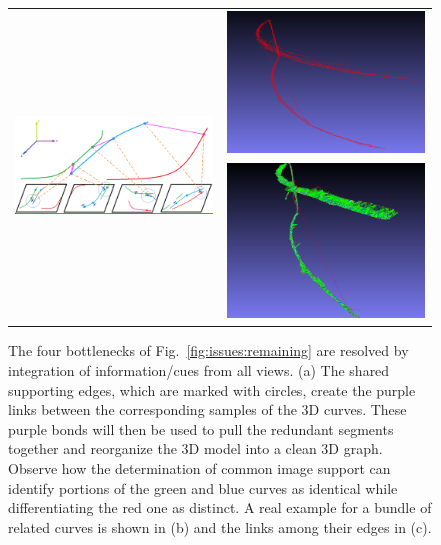 \documentclass[a4paper,titlepage]{article}
\newcommand{\draftnote}[1]{\marginpar{\tiny\raggedright\textsf{\hspace{0pt}#1}}}
\begin{document}
\begin{figure}
	\centering
	\begin{tabular}{cc}
		\multirow{2}[2]{*}[20mm]{\includegraphics[width=0.75\linewidth]{figs/master-figure.png}} &
		\includegraphics[width=0.2\linewidth]{figs/cluster32-2.png}\\
		&
		\includegraphics[width=0.2\linewidth]{figs/cluster32-corr2.png} \\
	\end{tabular}
	\caption{\small The four bottlenecks of
		Fig.~\ref{fig:issues:remaining} are resolved by integration of
		information/cues from all views. (a) The shared supporting edges, which are marked with circles, create the purple links between the corresponding samples of the 3D curves. These purple bonds will then be used to pull the redundant segments together and reorganize the 3D model into a clean 3D graph. Observe how the determination of common	image support can identify portions of the green and blue curves as identical	while differentiating the red one as distinct. A real example for a bundle of related curves is shown in (b) and the links among their edges in (c).
	}
\end{figure}
\end{document}
